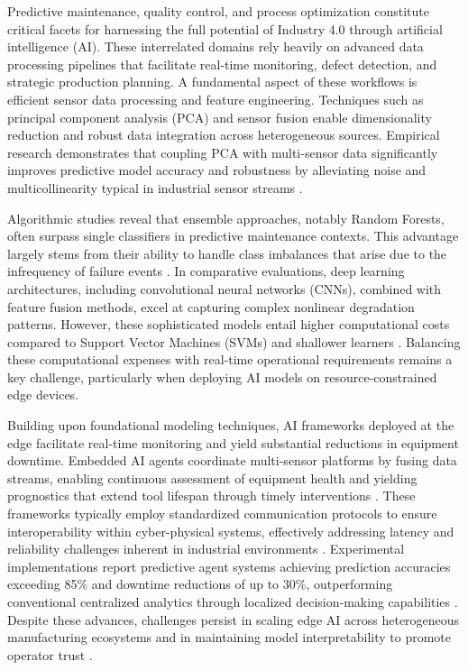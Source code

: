 \documentclass[sigconf]{acmart}
\begin{document}
Predictive maintenance, quality control, and process optimization constitute critical facets for harnessing the full potential of Industry 4.0 through artificial intelligence (AI). These interrelated domains rely heavily on advanced data processing pipelines that facilitate real-time monitoring, defect detection, and strategic production planning. A fundamental aspect of these workflows is efficient sensor data processing and feature engineering. Techniques such as principal component analysis (PCA) and sensor fusion enable dimensionality reduction and robust data integration across heterogeneous sources. Empirical research demonstrates that coupling PCA with multi-sensor data significantly improves predictive model accuracy and robustness by alleviating noise and multicollinearity typical in industrial sensor streams \cite{ref30,ref33}.

Algorithmic studies reveal that ensemble approaches, notably Random Forests, often surpass single classifiers in predictive maintenance contexts. This advantage largely stems from their ability to handle class imbalances that arise due to the infrequency of failure events \cite{ref29}. In comparative evaluations, deep learning architectures, including convolutional neural networks (CNNs), combined with feature fusion methods, excel at capturing complex nonlinear degradation patterns. However, these sophisticated models entail higher computational costs compared to Support Vector Machines (SVMs) and shallower learners \cite{ref24,ref32}. Balancing these computational expenses with real-time operational requirements remains a key challenge, particularly when deploying AI models on resource-constrained edge devices.

Building upon foundational modeling techniques, AI frameworks deployed at the edge facilitate real-time monitoring and yield substantial reductions in equipment downtime. Embedded AI agents coordinate multi-sensor platforms by fusing data streams, enabling continuous assessment of equipment health and yielding prognostics that extend tool lifespan through timely interventions \cite{ref35}. These frameworks typically employ standardized communication protocols to ensure interoperability within cyber-physical systems, effectively addressing latency and reliability challenges inherent in industrial environments \cite{ref36}. Experimental implementations report predictive agent systems achieving prediction accuracies exceeding 85\% and downtime reductions of up to 30\%, outperforming conventional centralized analytics through localized decision-making capabilities \cite{ref35}. Despite these advances, challenges persist in scaling edge AI across heterogeneous manufacturing ecosystems and in maintaining model interpretability to promote operator trust \cite{ref38}.
\end{document}
